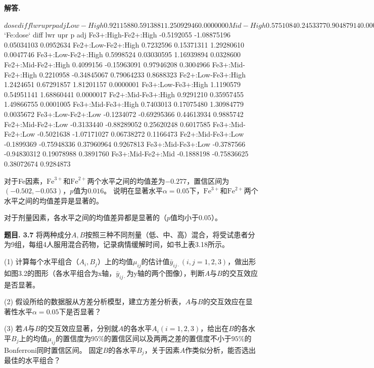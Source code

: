 \documentclass[12pt, a4paper, oneside]{ctexart}
\newcounter{problem}  %
\newenvironment{problem}[1][]{\stepcounter{problem}\par\noindent\textbf{题目\arabic{problem}. #1}}{\smallskip\par}
\newenvironment{solution}[1][]{\par\noindent\textbf{#1解答. }}{\smallskip\par}  %
\begin{document}
\begin{solution}
\begin{rcode}
$dose
                diff        lwr         upr     p adj
Low-High  0.9211588  0.5913881  1.25092946 0.0000000
Mid-High  0.5751084  0.2453377  0.90487914 0.0002042
Mid-Low  -0.3460503 -0.6758210 -0.01627962 0.0373939

$`Fe:dose`
                        diff         lwr        upr     p adj
Fe3+:High-Fe2+:High -0.5192055 -1.08875196 0.05034103 0.0952634
Fe2+:Low-Fe2+:High   0.7232596  0.15371311 1.29280610 0.0047746
Fe3+:Low-Fe2+:High   0.5998524  0.03030595 1.16939894 0.0328600
Fe2+:Mid-Fe2+:High   0.4099156 -0.15963091 0.97946208 0.3004966
Fe3+:Mid-Fe2+:High   0.2210958 -0.34845067 0.79064233 0.8688323
Fe2+:Low-Fe3+:High   1.2424651  0.67291857 1.81201157 0.0000001
Fe3+:Low-Fe3+:High   1.1190579  0.54951141 1.68860441 0.0000017
Fe2+:Mid-Fe3+:High   0.9291210  0.35957455 1.49866755 0.0001005
Fe3+:Mid-Fe3+:High   0.7403013  0.17075480 1.30984779 0.0035672
Fe3+:Low-Fe2+:Low   -0.1234072 -0.69295366 0.44613934 0.9885742
Fe2+:Mid-Fe2+:Low   -0.3133440 -0.88289052 0.25620248 0.6017585
Fe3+:Mid-Fe2+:Low   -0.5021638 -1.07171027 0.06738272 0.1166473
Fe2+:Mid-Fe3+:Low   -0.1899369 -0.75948336 0.37960964 0.9267813
Fe3+:Mid-Fe3+:Low   -0.3787566 -0.94830312 0.19078988 0.3891760
Fe3+:Mid-Fe2+:Mid   -0.1888198 -0.75836625 0.38072674 0.9284873

    \end{rcode}
对于Fe因素，$\text{Fe}^{3+}$和$\text{Fe}^{2+}$两个水平之间的均值差为$-0.277$，置信区间为$(-0.502, -0.053)$，$p$值为$0.016$。
说明在显著水平$\alpha=0.05$下，$\text{Fe}^{3+}$和$\text{Fe}^{2+}$两个水平之间的均值差异是显著的。

对于剂量因素，各水平之间的均值差异都是显著的（$p$值均小于$0.05$）。
\end{solution}
\begin{problem}[3.7]
    将两种成分$A,B$按照三种不同剂量（低、中、高）混合，将受试患者分为9组，每组4人服用混合药物，记录病情缓解时间，如书上表3.18所示。

    (1) 计算每个水平组合（$A_i,B_j$）上的均值$\mu_{ij}$的估计值$\bar{y}_{ij\cdot}(i,j=1,2,3)$，做出形如图3.2的图形（各水平组合为x轴，$\bar{y}_{ij\cdot}$为y轴的两个图像），判断$A$与$B$的交互效应是否显著。

    (2) 假设所给的数据服从方差分析模型，建立方差分析表，$A$与$B$的交互效应在显著性水平$\alpha=0.05$下是否显著？

    (3) 若$A$与$B$的交互效应显著，分别就$A$的各水平$A_i(i=1,2,3)$，给出在$B$的各水平$B_j$上的均值$\mu_{ij}$的置信度为$95\%$的置信区间以及两两之差的置信度不小于$95\%$的Bonferroni同时置信区间。
    固定$B$的各水平$B_j$，关于因素$A$作类似分析，能否选出最佳的水平组合？
\end{problem}
\end{document}
